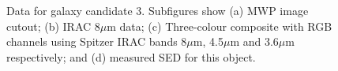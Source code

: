 \documentclass[times,usenatbib]{mn2e}
\begin{document}
\begin{figure}
\begin{center}
\caption{Data for galaxy candidate 3. Subfigures show (a) MWP image cutout; (b) IRAC 8$\mu$m data; (c) Three-colour composite with RGB channels using Spitzer IRAC bands 8$\mu$m, 4.5$\mu$m and 3.6$\mu$m respectively; and (d) measured SED for this object.}
\label{gal3}
\end{center}
\end{figure} 
\end{document}
